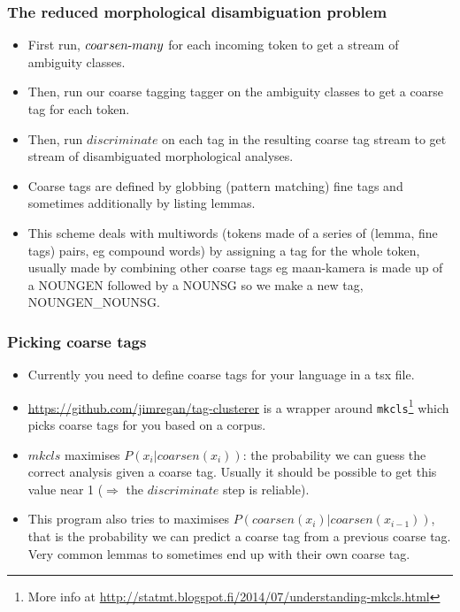 \documentclass{beamer}
\begin{document}
\begin{frame}
\frametitle{The reduced morphological disambiguation problem}
\begin{itemize}

  \item First run, $coarsen\hbox{-}many$ for each incoming token to get a
    stream of ambiguity classes.

  \item Then, run our coarse tagging tagger on the ambiguity classes to get a
    coarse tag for each token.

  \item Then, run $discriminate$ on each tag in the resulting coarse tag stream
    to get stream of disambiguated morphological analyses.

  \item Coarse tags are defined by globbing (pattern matching) fine tags and
    sometimes additionally by listing lemmas.

  \item This scheme deals with multiwords (tokens made of a series of
    (lemma, fine tags) pairs, eg compound words) by assigning a tag for the
    whole token, usually made by combining other coarse tags eg maan-kamera is
    made up of a NOUNGEN followed by a NOUNSG so we make a new tag,
    NOUNGEN\_NOUNSG.

\end{itemize}
\end{frame}

\begin{frame}
\frametitle{Picking coarse tags}
\begin{itemize}

  \item Currently you need to define coarse tags for your language in a tsx
    file.

  \item \url{https://github.com/jimregan/tag-clusterer} is a wrapper around
    \texttt{mkcls}\footnote{More info at
    \url{http://statmt.blogspot.fi/2014/07/understanding-mkcls.html}} which
    picks coarse tags for you based on a corpus.

  \item $mkcls$ maximises $P(x_i|coarsen(x_i))$: the probability
    we can guess the correct analysis given a coarse tag. Usually it should be
    possible to get this value near 1 ($\Rightarrow$ the $discriminate$ step is
    reliable).

  \item This program also tries to maximises
    $P(coarsen(x_i)|coarsen(x_{i-1}))$, that is the probability we can predict
    a coarse tag from a previous coarse tag. Very common lemmas to sometimes
    end up with their own coarse tag.

\end{itemize}
\end{frame}
\end{document}

